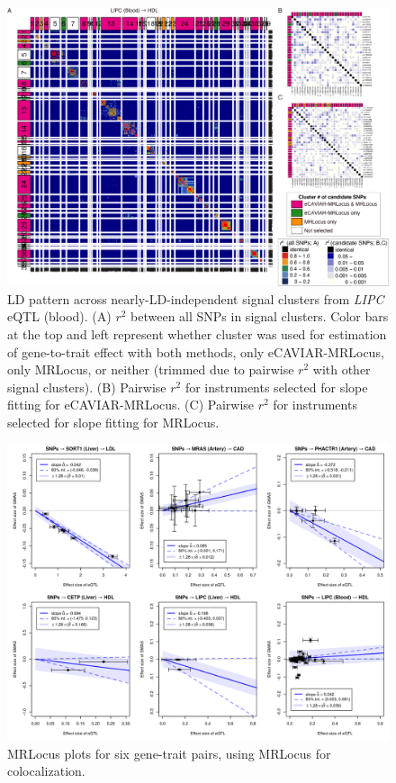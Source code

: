 \documentclass[11pt]{article}
\begin{document}
\begin{figure}[!ht]
  \centering
  \includegraphics[width=\textwidth]{figs/region/heatmap_eQTLbase.Blood_LIPC_HDL.20210114.png}
  \caption{LD pattern across nearly-LD-independent signal clusters
    from \emph{LIPC} eQTL (blood).
    (A) $r^2$ between all SNPs in signal clusters. Color bars at the
    top and left represent whether cluster was used for estimation of
    gene-to-trait effect with both methods, only eCAVIAR-MRLocus, only
    MRLocus, or neither (trimmed due to pairwise $r^2$ with other
    signal clusters). (B) Pairwise $r^2$ for instruments selected for
    slope fitting for eCAVIAR-MRLocus. (C) Pairwise $r^2$ for
    instruments selected for slope fitting for MRLocus.}
\end{figure}

\begin{figure}[!ht]
  \centering
  \includegraphics[width=\textwidth]{figs/real_loci_mrlocus.png}
  \caption{MRLocus plots for six gene-trait pairs, using MRLocus for colocalization.}
\end{figure}
\end{document}
